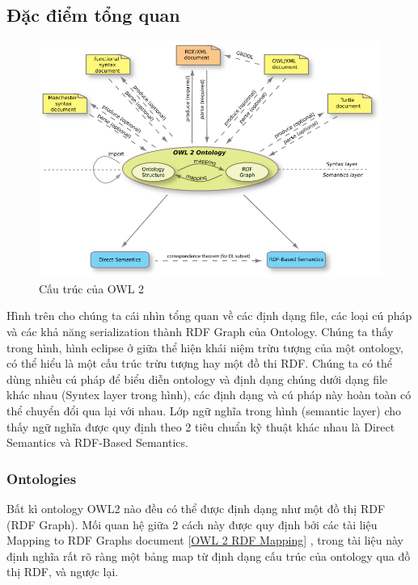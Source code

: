 \subsection{Đặc điểm tổng quan}
\begin{figure}[h!]
	\centering
	\includegraphics[width=120mm]{Figures/owl2structure.png}
	\caption{Cấu trúc của OWL 2\label{overflow}}
\end{figure}
Hình trên cho chúng ta cái nhìn tổng quan về các định dạng file, các loại cú pháp và các khả năng serialization thành RDF Graph của Ontology. Chúng ta thấy trong hình, hình eclipse ở giữa thể hiện khái niệm trừu tượng của một ontology, có thể hiểu là một cấu trúc trừu tượng hay một đồ thi RDF. Chúng ta có thể dùng nhiều cú pháp để biểu diễn ontology và định dạng chúng dưới dạng file khác nhau (Syntex layer trong hình), các định dạng và cú pháp này hoàn toàn có thể chuyển đổi qua lại với nhau. Lớp ngữ nghĩa trong hình (semantic layer) cho thấy ngữ nghĩa được quy định theo 2 tiêu chuẩn kỹ thuật khác nhau là Direct Semantics và RDF-Based Semantics.
\subsubsection{Ontologies}
Bất kì ontology OWL2 nào đều có thể được định dạng như một đồ thị RDF (RDF Graph). Mối quan hệ giữa 2 cách này được quy định bởi các tài liệu Mapping to RDF Graphs document [\href{http://www.w3.org/TR/owl2-overview/#ref-owl-2-rdf-mapping}{OWL 2 RDF Mapping}] \cite{mapping_rdf_graph}, trong tài liệu này định nghĩa rất rõ ràng một bảng map từ định dạng cấu trúc của ontology qua đồ thị RDF, và ngược lại. 
